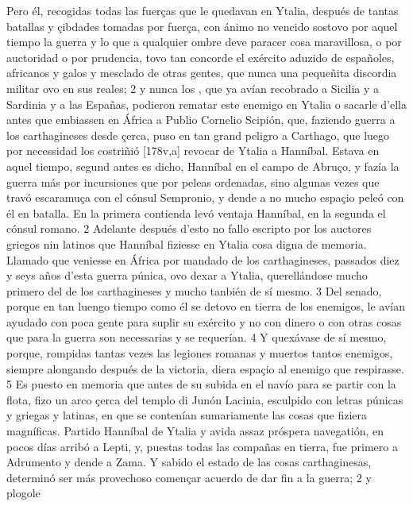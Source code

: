\documentclass[11pt,twoside]{article}\makeatletter
\def\persName{}\def\name{}
\def\placeName{}
\begin{document}
\pend
{} Pero él, recogidas todas las fuerças que le quedavan en Ytalia, después de tantas batallas y çibdades tomadas por fuerça, con ánimo no vencido sostovo por aquel tiempo la guerra y lo que a qualquier ombre deve paracer cosa maravillosa, o por auctoridad o por prudencia, tovo tan concorde el exército aduzido de españoles, africanos y galos y mesclado de otras gentes, que nunca una pequeñita discordia militar ovo en sus reales; 2 y nunca los , que ya avían recobrado a  {\placeName Sicilia} y a  {\placeName Sardinia} y a las  {\placeName Españas}, podieron rematar este enemigo en Ytalia o sacarle d’ella antes que embiassen en  {\placeName África} a Publio Cornelio Scipión, que, faziendo guerra a los  {\name carthagineses} desde çerca, puso en tan grand peligro a  {\placeName Carthago}, que luego por necessidad los costriñió %
[178v,a] revocar de Ytalia a  {\persName Hanníbal}.
\pend
{} Estava en aquel tiempo, segund antes es dicho,  {\persName Hanníbal} en el campo de Abruço, y fazía la guerra más por incursiones que por peleas ordenadas, sino algunas vezes que travó escaramuça con el cónsul Sempronio, y dende a no mucho espaçio peleó con él en batalla. En la primera contienda levó ventaja  {\persName Hanníbal}, en la segunda el cónsul romano. 2 Adelante después d’esto no fallo escripto por los auctores griegos nin latinos que  {\persName Hanníbal} fiziesse en Ytalia cosa digna de memoria. Llamado que veniesse en  {\placeName África} por mandado de los  {\name carthagineses}, passados diez y seys años d’esta guerra púnica, ovo dexar a Ytalia, querellándose mucho primero del  de los  {\name carthagineses} y mucho tanbién de sí mesmo. 3 Del senado, porque en tan luengo tiempo como él se detovo en tierra de los enemigos, le avían ayudado con poca gente para suplir su exército y no con dinero o con otras cosas que para la guerra son necessarias y se requerían. 4 Y quexávase de sí mesmo, porque, rompidas tantas vezes las legiones romanas y muertos tantos enemigos, siempre alongando después de la victoria, diera espaçio al enemigo que respirasse. 5 Es puesto en memoria que antes de su subida en el navío para se partir con la flota, fizo un arco çerca del templo di Junón Lacinia, esculpido con letras púnicas y griegas y latinas, en que se contenían sumariamente las cosas que fiziera magníficas.
\pend
{} Partido  {\persName Hanníbal} de Ytalia y avida assaz próspera navegatión, en pocos días arribó a Lepti, y, puestas todas las compañas en tierra, fue primero a Adrumento y dende a Zama. Y sabido el estado de las cosas carthaginesas, determinó ser más provechoso començar acuerdo de dar fin a la guerra; 2 y plogole %
\end{document}
